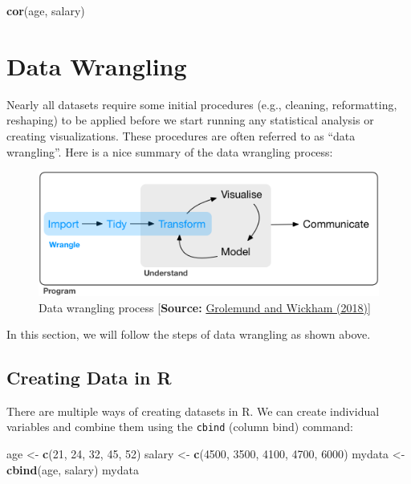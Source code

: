 \documentclass[]{book}
\newenvironment{Shaded}{\begin{snugshade}}{\end{snugshade}}
\newcommand{\DecValTok}[1]{\textcolor[rgb]{0.00,0.00,0.81}{#1}}
\newcommand{\KeywordTok}[1]{\textcolor[rgb]{0.13,0.29,0.53}{\textbf{#1}}}
\newcommand{\NormalTok}[1]{#1}
\newcommand{\StringTok}[1]{\textcolor[rgb]{0.31,0.60,0.02}{#1}}
\begin{document}
\begin{Shaded}
\begin{Highlighting}[]
\KeywordTok{cor}\NormalTok{(age, salary)}
\end{Highlighting}
\end{Shaded}

\hypertarget{part2}{%
\chapter{Data Wrangling}\label{part2}}

Nearly all datasets require some initial procedures (e.g., cleaning, reformatting, reshaping) to be applied before we start running any statistical analysis or creating visualizations. These procedures are often referred to as ``data wrangling''. Here is a nice summary of the data wrangling process:

\begin{figure}
\centering
\includegraphics{figure/data-science-wrangle.png}
\caption{Data wrangling process {[}\textbf{Source:} \href{https://r4ds.had.co.nz/wrangle-intro.html}{Grolemund and Wickham (2018)}{]}}
\end{figure}

In this section, we will follow the steps of data wrangling as shown above.

\hypertarget{creating-data-in-r}{%
\section{\texorpdfstring{Creating Data in \textbf{R}}{Creating Data in R}}\label{creating-data-in-r}}

There are multiple ways of creating datasets in R. We can create individual variables and combine them using the \texttt{cbind} (column bind) command:

\begin{Shaded}
\begin{Highlighting}[]
\NormalTok{age <-}\StringTok{ }\KeywordTok{c}\NormalTok{(}\DecValTok{21}\NormalTok{, }\DecValTok{24}\NormalTok{, }\DecValTok{32}\NormalTok{, }\DecValTok{45}\NormalTok{, }\DecValTok{52}\NormalTok{)}
\NormalTok{salary <-}\StringTok{ }\KeywordTok{c}\NormalTok{(}\DecValTok{4500}\NormalTok{, }\DecValTok{3500}\NormalTok{, }\DecValTok{4100}\NormalTok{, }\DecValTok{4700}\NormalTok{, }\DecValTok{6000}\NormalTok{)}
\NormalTok{mydata <-}\StringTok{ }\KeywordTok{cbind}\NormalTok{(age, salary)}
\NormalTok{mydata}
\end{Highlighting}
\end{Shaded}
\end{document}
